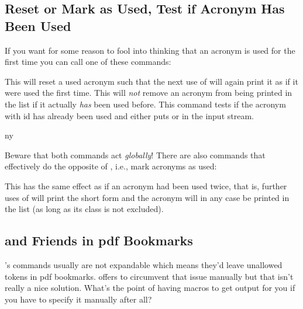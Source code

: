 \documentclass[DIV10,toc=index,toc=bib,hyperfootnotes=false]{cnpkgdoc}
\begin{document}
\subsection{Reset or Mark as Used, Test if Acronym Has Been Used}

If you want for some reason to fool \acro into thinking that an acronym is used
for the first time you can call one of these commands:
\begin{beschreibung}
 \newline
   This will reset a used acronym such that the next use of
    will again print it as if it were used the first time.  This will
   \emph{not} remove an acronym from being printed in the list if it actually
   \emph{has} been used before.
 \newline
   This command tests if the acronym with \ac{id}
    has already been used and either puts  or
    in the input stream.
\end{beschreibung}
\begin{beispiel}
 \ac{ny}
\end{beispiel}
Beware that both commands act \emph{globally}! There are also commands that
effectively do the opposite of , i.e., mark acronyms as used:
\begin{beschreibung}
 \newline
   This has the same effect as if an acronym had been used
   twice, that is, further uses of  will print the short form and the
   acronym will in any case be printed in the list (as long as its class is
   not excluded).
\end{beschreibung}

\subsection{ and Friends in \acs*{pdf} Bookmarks}
\noindent{}\acro's commands usually are not expandable which
means they'd leave unallowed tokens in \acs{pdf} bookmarks. 
offers  to circumvent that issue manually but that isn't
really a nice solution. What's the point of having macros to get output for you
if you have to specify it manually after all?
\end{document}
